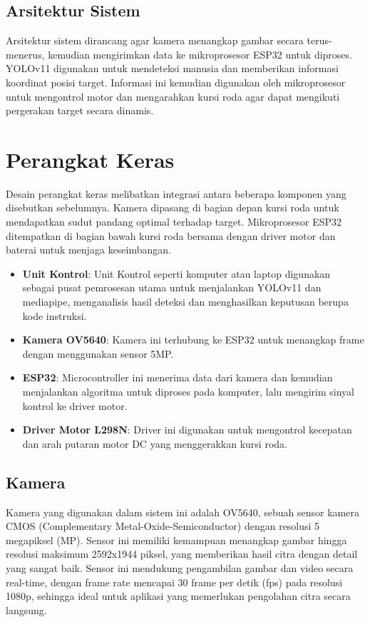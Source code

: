 \subsection{Arsitektur Sistem}
\label{subsec:arsitektursistem}

Arsitektur sistem dirancang agar kamera menangkap gambar secara terus-menerus, kemudian mengirimkan data ke mikroprosesor ESP32 untuk diproses. YOLOv11 digunakan untuk mendeteksi manusia dan memberikan informasi koordinat posisi target. Informasi ini kemudian digunakan oleh mikroprosesor untuk mengontrol motor dan mengarahkan kursi roda agar dapat mengikuti pergerakan target secara dinamis.

\section{Perangkat Keras}
\label{sec:perangkathardware}

Desain perangkat keras melibatkan integrasi antara beberapa komponen yang disebutkan sebelumnya. Kamera dipasang di bagian depan kursi roda untuk mendapatkan sudut pandang optimal terhadap target. Mikroprosesor ESP32 ditempatkan di bagian bawah kursi roda bersama dengan driver motor dan baterai untuk menjaga keseimbangan.

\begin{itemize}[nolistsep]
    \item \textbf{Unit Kontrol}: Unit Kontrol seperti komputer atau laptop digunakan sebagai pusat pemrosesan utama untuk menjalankan YOLOv11 dan mediapipe, menganalisis hasil deteksi dan menghasilkan keputusan berupa kode instruksi.
    \item \textbf{Kamera OV5640}: Kamera ini terhubung ke ESP32 untuk menangkap frame dengan menggunakan sensor 5MP.
    \item \textbf{ESP32}: Microcontroller ini menerima data dari kamera dan kemudian menjalankan algoritma untuk diproses pada komputer, lalu mengirim sinyal kontrol ke driver motor.
    \item \textbf{Driver Motor L298N}: Driver ini digunakan untuk mengontrol kecepatan dan arah putaran motor DC yang menggerakkan kursi roda.
\end{itemize}

\subsection{Kamera}
\label{subsec:kamera}
Kamera yang digunakan dalam sistem ini adalah OV5640, sebuah sensor kamera CMOS (Complementary Metal-Oxide-Semiconductor) dengan resolusi 5 megapiksel (MP). Sensor ini memiliki kemampuan menangkap gambar hingga resolusi maksimum 2592x1944 piksel, yang memberikan hasil citra dengan detail yang sangat baik. Sensor ini mendukung pengambilan gambar dan video secara real-time, dengan frame rate mencapai 30 frame per detik (fps) pada resolusi 1080p, sehingga ideal untuk aplikasi yang memerlukan pengolahan citra secara langsung.

